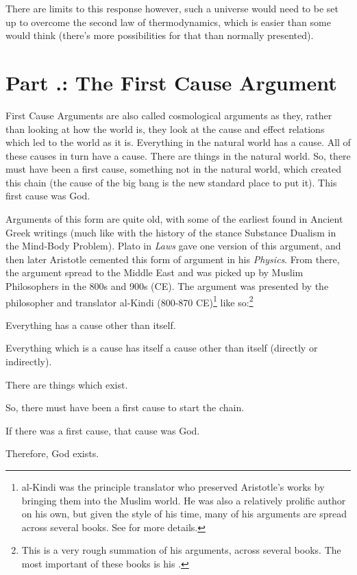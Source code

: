 There are limits to this response however, such a universe would need to be set up to overcome the second law of thermodynamics, which is easier than some would think (there's more possibilities for that than normally presented).

\section{Part \thechapcount.\theseccount: The First Cause Argument}
First Cause Arguments are also called \glspl{cosmological argument} as they, rather than looking at how the world is, they look at the cause and effect relations which led to the world as it is.   Everything in the natural world has a cause. All of these causes in turn have a cause. There are things in the natural world. So, there must have been a first cause, something not in the natural world, which created this chain (the cause of the big bang is the new standard place to put it). This first cause was God. 

Arguments of this form are quite old, with some of the earliest found in Ancient Greek writings (much like with the history of the stance Substance Dualism in the Mind-Body Problem). Plato in \emph{Laws} gave one version of this argument, and then later Aristotle cemented this form of argument in his \emph{Physics}. From there, the argument spread to the Middle East and was picked up by Muslim Philosophers in the 800s and 900s (CE). The argument was presented by the philosopher and translator al-Kindi (800-870 CE)\footnote{al-Kindi was the principle translator who preserved Aristotle's works by bringing them into the Muslim world. He was also a relatively prolific author on his own, but given the style of his time, many of his arguments are spread across several books. See  for more details.} like so:\footnote{This is a very rough summation of his arguments, across several books. The most important of these books is his .}
 
\begin{earg}
\item[1 ] Everything has a cause other than itself.
\item[2 ] Everything which is a cause has itself a cause other than itself (directly or indirectly).
\item[3 ] There are things which exist.
\item[4 ] So, there must have been a first cause to start the chain.
\item[5 ] If there was a first cause, that cause was God.
\item[6 ] Therefore, God exists.
\end{earg}
 
